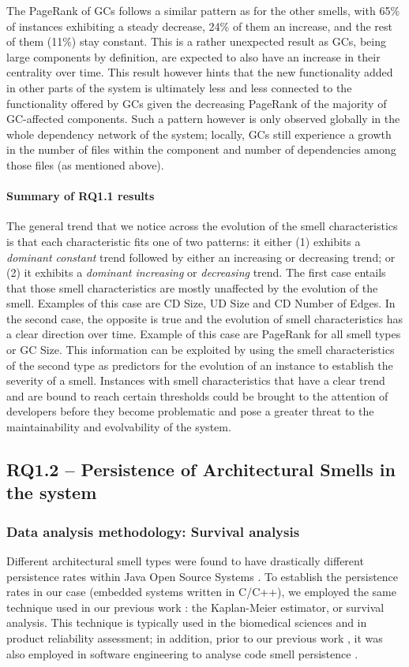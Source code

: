 The PageRank of GCs follows a similar pattern as for the other smells, with 65\% of instances exhibiting a steady decrease, 24\% of them an increase, and the rest of them (11\%) stay constant.
This is a rather unexpected result as GCs, being large components by definition, are expected to also have an increase in their centrality over time.
This result however hints that the new functionality added in other parts of the system is ultimately less and less connected to the functionality offered by GCs given the decreasing PageRank of the majority of GC-affected components.
Such a pattern however is only observed globally in the whole dependency network of the system; locally, GCs still experience a growth in the number of files within the component and number of dependencies among those files (as mentioned above).

\paragraph{Summary of RQ1.1 results}
The general trend that we notice across the evolution of the smell characteristics is that each characteristic fits one of two patterns: it either (1) exhibits a \emph{dominant constant} trend followed by either an increasing or decreasing trend; or (2) it exhibits a \emph{dominant increasing} or \emph{decreasing} trend. 
The first case entails that those smell characteristics are mostly unaffected by the evolution of the smell. Examples of this case are CD Size, UD Size and CD Number of Edges.
In the second case, the opposite is true and the evolution of smell characteristics has a clear direction over time. Example of this case are PageRank for all smell types or GC Size.
This information can be exploited by using the smell characteristics of the second type as predictors for the evolution of an instance to establish the severity of a smell.
Instances with smell characteristics that have a clear trend and are bound to reach certain thresholds could be brought to the attention of developers before they become problematic and pose a greater threat to the maintainability and evolvability of the system.

\subsection{RQ1.2 -- Persistence of Architectural Smells in the system}
\subsubsection{Data analysis methodology: Survival analysis}
Different architectural smell types were found to have drastically different persistence rates within Java Open Source Systems \cite{Sas2019}.
To establish the persistence rates in our case (embedded systems written in C/C++), we employed the same technique used in our previous work \cite{Sas2019}: the Kaplan-Meier estimator, or survival analysis.
This technique is typically used in the biomedical sciences and in product reliability assessment; in addition, prior to our previous work \cite{Sas2019}, it was also employed in software engineering to analyse code smell persistence \cite{Chatzigeorgiou2014}.

